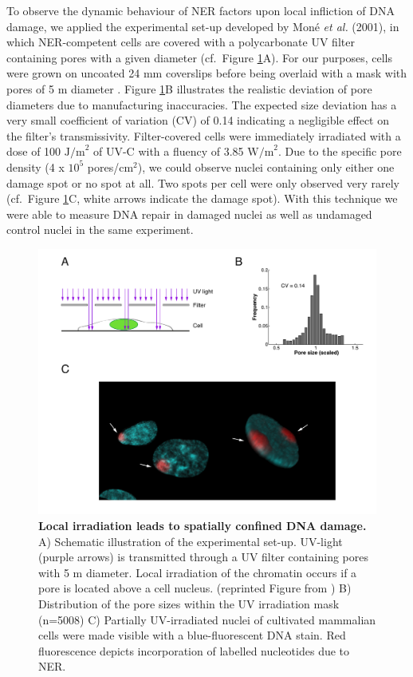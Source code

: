 To observe the dynamic behaviour of NER factors upon local infliction of DNA damage, we applied the experimental set-up developed by Mon\'e \textit{et al.} (2001)\cite{Mone2001}, in which NER-competent cells are covered with a polycarbonate UV filter containing pores with a given diameter (cf.\ Figure \ref{fig:accuMethod}A). For our purposes, cells were grown on uncoated 24 mm coverslips before being overlaid with a mask with pores of 5 \textmu m diameter \cite{Verbruggen2014}. Figure \ref{fig:accuMethod}B illustrates the realistic deviation of pore diameters due to manufacturing inaccuracies. The expected size deviation has a very small coefficient of variation (CV) of 0.14 indicating a negligible effect on the filter's transmissivity. Filter-covered cells were immediately irradiated with a dose of 100 $\text{J/m}^\text{2}$ of UV-C with a fluency of 3.85 $\text{W/m}^\text{2}$. Due to the specific pore density (4 x $\text{10}^\text{5}$ pores/$\text{cm}^\text{2}$), we could observe nuclei containing only either one damage spot or no spot at all. Two spots per cell were only observed very rarely (cf.\ Figure \ref{fig:accuMethod}C, white arrows indicate the damage spot). With this technique we were able to measure DNA repair in damaged nuclei as well as undamaged control nuclei in the same experiment.

\begin{figure}[t!]
	\begin{center}
		\includegraphics[width=1\textwidth]{Abbildungen/figure2_1.pdf}
		\caption{\textbf{Local irradiation leads to spatially confined DNA damage.} A) Schematic illustration of the experimental set-up. UV-light (purple arrows) is transmitted through a UV filter containing pores with 5 \textmu m diameter. Local irradiation of the chromatin occurs if a pore is located above a cell nucleus. (reprinted Figure from \cite{Terstiege2010}) B) Distribution of the pore sizes within the UV irradiation mask (n=5008) C) Partially UV-irradiated nuclei of cultivated mammalian cells were made visible with a blue-fluorescent DNA stain. Red fluorescence depicts incorporation of labelled nucleotides due to NER.}
		\label{fig:accuMethod}
	\end{center}
\end{figure}

